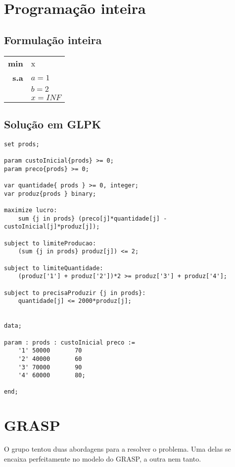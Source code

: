 \documentclass{report}
\begin{document}
\chapter{Programação inteira}

\section{Formulação inteira}

\begin{center}
\begin{tabular}{ r l }
  \textbf{min} & x \\
  \textbf{s.a} & $a = 1$ \\
  & $b = 2$ \\
  & $x = INF$ \\
\end{tabular}
\end{center}

\section{Solução em GLPK}

\begin{lstlisting}
set prods;

param custoInicial{prods} >= 0;
param preco{prods} >= 0;

var quantidade{ prods } >= 0, integer;
var produz{prods } binary;

maximize lucro:
	sum {j in prods} (preco[j]*quantidade[j] - custoInicial[j]*produz[j]);

subject to limiteProducao:
	(sum {j in prods} produz[j]) <= 2;

subject to limiteQuantidade:
	(produz['1'] + produz['2'])*2 >= produz['3'] + produz['4'];

subject to precisaProduzir {j in prods}:
	quantidade[j] <= 2000*produz[j];


data;

param : prods : custoInicial preco :=
	'1'	50000		70
	'2'	40000		60
	'3'	70000		90
	'4'	60000		80;

end;
\end{lstlisting}

\chapter{GRASP}

O grupo tentou duas abordagens para a resolver o problema. Uma delas se encaixa
perfeitamente no modelo do GRASP,  a outra nem tanto.
\end{document}
